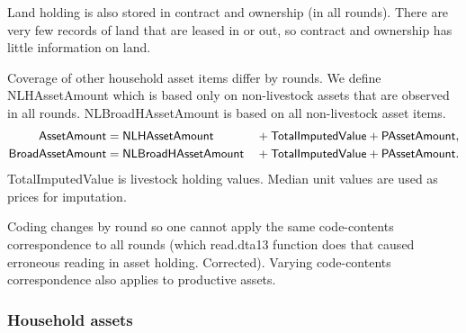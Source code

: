 Land holding is also stored in \textsf{contract and ownership} (in all rounds). There are very few records of land that are leased in or out, so \textsf{contract and ownership} has little information on land. 

Coverage of other household asset items differ by rounds. We define \textsf{NLHAssetAmount} which is based only on non-livestock assets that are observed in all rounds. \textsf{NLBroadHAssetAmount} is based on all non-livestock asset items. 
\[
\begin{aligned}
\mbox{\textsf{AssetAmount}}
&=\mbox{\textsf{NLHAssetAmount}}&&+\mbox{\textsf{TotalImputedValue}}+\mbox{\textsf{PAssetAmount}},\\
\mbox{\textsf{BroadAssetAmount}}
&=\mbox{\textsf{NLBroadHAssetAmount}}&&+\mbox{\textsf{TotalImputedValue}}+\mbox{\textsf{PAssetAmount}}.
\end{aligned}
\]
\textsf{TotalImputedValue} is livestock holding values. Median unit values are used as prices for imputation.

Coding changes by round so one cannot apply the same code-contents correspondence to all rounds (which read.dta13 function does that caused erroneous reading in asset holding. Corrected). Varying code-contents correspondence also applies to \textsf{productive assets}. 

\subsubsection{Household assets}


